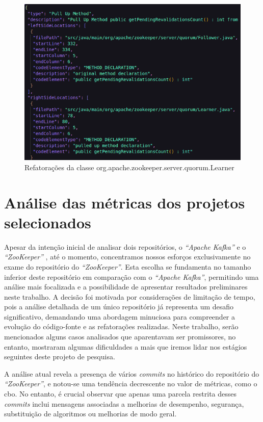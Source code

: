 \begin{figure}[h]
    \centering
    \includegraphics[width=0.8\linewidth]{figuras/Output/RefactoringMiner/org.apache.zookeeper.server.quorum.Learner.png}
    \caption{Refatorações da classe org.apache.zookeeper.server.quorum.Learner}
    \label{fig:RefactoringMinerOutput}
\end{figure}

\section{Análise das métricas dos projetos selecionados}
Apesar da intenção inicial de analisar dois repositórios, o \textit{``Apache Kafka''} \cite{KafkaGitHub} e o \textit{``ZooKeeper''} \cite{ZookeeperGitHub}, até o momento, concentramos nossos esforços exclusivamente no exame do repositório do \textit{``ZooKeeper''}. Esta escolha se fundamenta no tamanho inferior deste repositório em comparação com o \textit{``Apache Kafka''}, permitindo uma análise mais focalizada e a possibilidade de apresentar resultados preliminares neste trabalho. A decisão foi motivada por considerações de limitação de tempo, pois a análise detalhada de um único repositório já representa um desafio significativo, demandando uma abordagem minuciosa para compreender a evolução do código-fonte e as refatorações realizadas.  Neste trabalho, serão mencionados alguns casos analisados que aparentavam ser promissores, no entanto, mostraram algumas dificuldades a mais que iremos lidar nos estágios seguintes deste projeto de pesquisa.

A análise atual revela a presença de vários \textit{commits} no histórico do repositório do \textit{``ZooKeeper''}, e notou-se uma tendência decrescente no valor de métricas, como o \gls{cbo}. No entanto, é crucial observar que apenas uma parcela restrita desses \textit{commits} inclui mensagens associadas a melhorias de desempenho, segurança, substituição de algoritmos ou melhorias de modo geral. 

